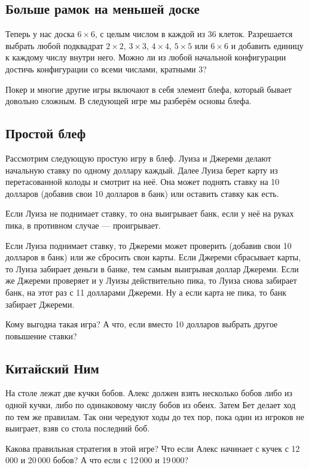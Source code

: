 \subsection*{Больше рамок на меньшей доске}

Теперь у нас доска $6 \times 6$, с целым числом в каждой из $36$ клеток.
Разрешается выбрать любой подквадрат $2 \times 2$, $3 \times 3$, $4 \times 4$, $5 \times 5$ или $6 \times 6$ и добавить единицу к каждому числу внутри него.
Можно ли из любой начальной конфигурации достичь конфигурации со всеми числами, кратными $3$?


\medskip

Покер и многие другие игры включают в себя элемент блефа, который бывает довольно сложным.
В следующей игре мы разберём основы блефа.

\subsection*{Простой блеф}

Рассмотрим следующую простую игру в блеф.
Луиза и Джереми делают начальную ставку по одному доллару каждый.
Далее Луиза берет карту из перетасованной колоды и смотрит на неё.
Она может поднять ставку на 10 долларов (добавив свои 10 долларов в банк) или оставить ставку как есть.

Если Луиза не поднимает ставку, то она выигрывает банк, если у неё на руках пика, в противном случае --- проигрывает.

Если Луиза поднимает ставку, то Джереми может проверить (добавив свои 10 долларов в банк) или же сбросить свои карты.
Если Джереми сбрасывает карты, то Луиза забирает деньги в банке, тем самым выигрывая доллар Джереми.
Если же Джереми проверяет и у Луизы действительно пика, то Луиза снова забирает банк, на этот раз с 11 долларами Джереми.
Ну а если карта не пика, то банк забирает Джереми.

Кому выгодна такая игра?
А что, если вместо 10 долларов выбрать другое повышение ставки?

\subsection*{Китайский Ним}

На столе лежат две кучки бобов.
Алекс должен взять несколько бобов либо из одной кучки, либо по одинаковому числу бобов из обеих.
Затем Бет делает ход по тем же правилам.
Так они чередуют ходы до тех пор, пока один из игроков не выиграет, взяв со стола последний боб.

Какова правильная стратегия в этой игре?
Что если Алекс начинает с кучек с 12\,000 и 20\,000 бобов?
А что если с 12\,000 и 19\,000?
